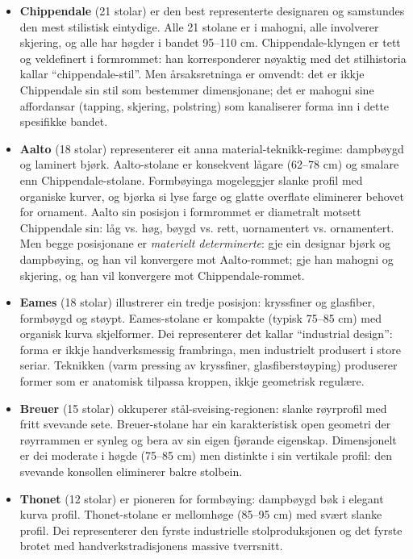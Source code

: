 \documentclass[10pt, a4paper, twocolumn]{article}
\begin{document}
\begin{itemize}
  \item \textbf{Chippendale} (21 stolar) er den best representerte designaren og samstundes den mest stilistisk eintydige. Alle 21 stolane er i mahogni, alle involverer skjering, og alle har høgder i bandet 95--110 cm. Chippendale-klyngen er tett og veldefinert i formrommet: han korresponderer nøyaktig med det stilhistoria kallar ``chippendale-stil''. Men årsaksretninga er omvendt: det er ikkje Chippendale sin stil som bestemmer dimensjonane; det er mahogni sine affordansar (tapping, skjering, polstring) som kanaliserer forma inn i dette spesifikke bandet.

  \item \textbf{Aalto} (18 stolar) representerer eit anna material-teknikk-regime: dampbøygd og laminert bjørk. Aalto-stolane er konsekvent lågare (62--78 cm) og smalare enn Chippendale-stolane. Formbøyinga mogeleggjer slanke profil med organiske kurver, og bjørka si lyse farge og glatte overflate eliminerer behovet for ornament. Aalto sin posisjon i formrommet er diametralt motsett Chippendale sin: låg vs. høg, bøygd vs. rett, uornamentert vs. ornamentert. Men begge posisjonane er \emph{materielt determinerte}: gje ein designar bjørk og dampbøying, og han vil konvergere mot Aalto-rommet; gje han mahogni og skjering, og han vil konvergere mot Chippendale-rommet.

  \item \textbf{Eames} (18 stolar) illustrerer ein tredje posisjon: kryssfiner og glasfiber, formbøygd og støypt. Eames-stolane er kompakte (typisk 75--85 cm) med organisk kurva skjelformer. Dei representerer det \citet{kirkham1995} kallar ``industrial design'': forma er ikkje handverksmessig frambringa, men industrielt produsert i store seriar. Teknikken (varm pressing av kryssfiner, glasfiberstøyping) produserer former som er anatomisk tilpassa kroppen, ikkje geometrisk regulære.

  \item \textbf{Breuer} (15 stolar) okkuperer stål-sveising-regionen: slanke røyrprofil med fritt svevande sete. Breuer-stolane har ein karakteristisk open geometri der røyrrammen er synleg og bera av sin eigen fjørande eigenskap. Dimensjonelt er dei moderate i høgde (75--85 cm) men distinkte i sin vertikale profil: den svevande konsollen eliminerer bakre stolbein.

  \item \textbf{Thonet} (12 stolar) er pioneren for formbøying: dampbøygd bøk i elegant kurva profil. Thonet-stolane er mellomhøge (85--95 cm) med svært slanke profil. Dei representerer den fyrste industrielle stolproduksjonen og det fyrste brotet med handverkstradisjonens massive tverrsnitt.
\end{itemize}
\end{document}
